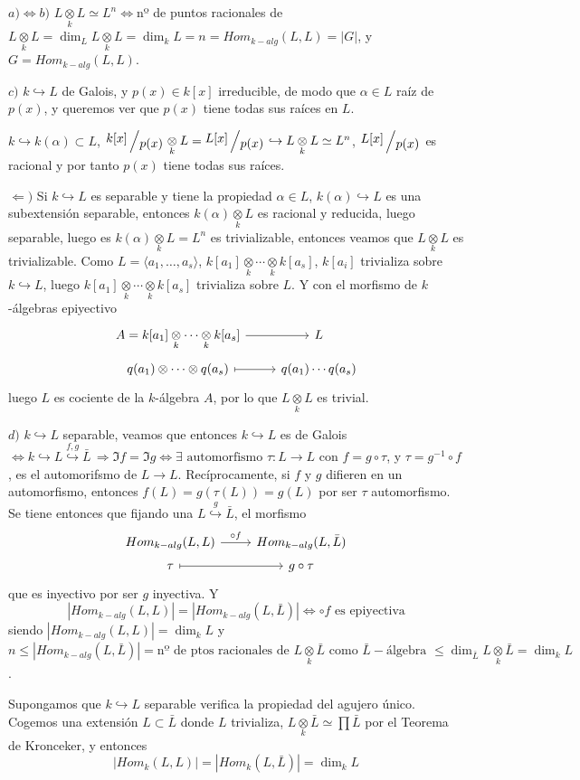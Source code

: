 \begin{dem}
    $a) \iff b)$ $L \underset{k}{\otimes}L \simeq L^n \iff $nº de puntos racionales de $L \underset{k}{\otimes}L = \dim_L L \underset{k}{\otimes}L = \dim_k L =n =Hom_{k-alg}(L,L) = |G|$, y $G=Hom_{k-alg}(L,L)$.

    $c)$ $k \hookrightarrow L$ de Galois, y $p(x)\in k[x]$ irreducible, de modo que $\alpha \in L$ ra\'iz de $p(x)$, y queremos ver que $p(x)$ tiene todas sus ra\'ices en $L$. 

    $k \hookrightarrow k(\alpha) \subset L$, $\modulo{k[x]}{p(x)} \underset{k}{\otimes}L = \modulo{L[x]}{p(x)} \hookrightarrow L \underset{k}{\otimes}L \simeq L^n$, $\modulo{L[x]}{p(x)} $ es racional y por tanto $p(x)$ tiene todas sus ra\'ices. 

    $\Leftarrow)$ Si $k \hookrightarrow L$ es separable y tiene la propiedad $\alpha \in L$, $k(\alpha) \hookrightarrow L$ es una subextensi\'on separable, entonces $k(\alpha) \underset{k}{\otimes}L$ es racional y reducida, luego separable, luego es $k(\alpha) \underset{k}{\otimes}L= L^n$ es trivializable, entonces veamos que $L\underset{k}{\otimes}L$ es trivializable. Como $L = \langle a_1, \ldots, a_s \rangle$, $k[a_1] \underset{k}{\otimes}\cdots \underset{k}{\otimes}k[a_s]$, $k[a_i]$ trivializa sobre $k \hookrightarrow L$, luego $k[a_1] \underset{k}{\otimes}\cdots \underset{k}{\otimes}k[a_s]$ trivializa sobre $L$. Y con el morfismo de $k$-\'algebras epiyectivo
    $$\bt A= k[a_1] \underset{k}{\otimes}\cdots \underset{k}{\otimes}k[a_s] \rar & L \\[-5mm] q(a_1) \otimes \cdots \otimes q(a_s) \rarmaps & q(a_1) \cdots q(a_s)  \et$$
    luego $L$ es cociente de la $k$-\'algebra $A$, por lo que $L \underset{k}{\otimes}L$ es trivial. 

    $d)$ $k \hookrightarrow L$ separable, veamos que entonces $k \hookrightarrow L$ es de Galois $\iff k \hookrightarrow L \overset{f, g}{\hookrightarrow} \bar L\, \Rightarrow \Im f= \Im g \iff \exists \text{ automorfismo } \tau: L \longrightarrow L  $ con $f=g\circ \tau$, y $\tau=g^{-1}\circ f$, es el automorifsmo de $L \to L$. Rec\'iprocamente, si $f$ y $g$ difieren en un automorfismo, entonces $f(L) = g(\tau(L)) = g(L)$ por ser $\tau$ automorfismo. Se tiene entonces que fijando una $ L \overset{g}{\hookrightarrow} \bar L$, el morfismo
    $$\bt Hom_{k-alg} (L,L)\rar{\circ f} & Hom_{k-alg}(L,\bar L) \\[-5mm] \tau \rarmaps & g \circ \tau  \et$$
    que es inyectivo por ser $g$ inyectiva. Y 
    $$|Hom_{k-alg}(L,L)| = |Hom_{k-alg}(L,\bar L)| \iff \circ f \text{ es epiyectiva}$$
    siendo $|Hom_{k-alg}(L,L)| = \dim_k L$ y $n \le |Hom_{k-alg}(L,\bar L)| = \text{nº de ptos racionales de } L\underset{k}{\otimes}\bar L \text{ como } \bar L-\text{\'algebra } \le \dim_{\bar L} L\underset{k}{\otimes}\bar L = \dim_k L $.

    Supongamos que $k \hookrightarrow L$ separable verifica la propiedad del agujero \'unico. Cogemos una extensi\'on $L \subset \bar L$ donde $L$ trivializa, $L\underset{k}{\otimes}\bar L \simeq \prod \bar L$ por el Teorema de Kronceker, y entonces
    $$ |Hom_k(L,L)|= |Hom_k(L,\bar L)| = \dim_k L$$ 
\end{dem}
